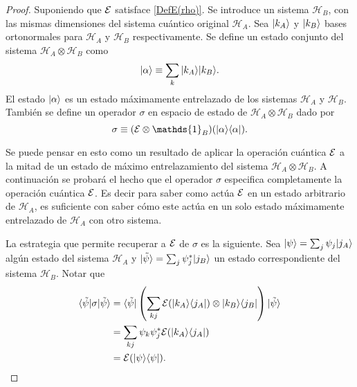 \begin{proof}
Suponiendo que $\mathcal{E}$ satisface {\ref{DefE(rho)}}. Se introduce un sistema
$\mathcal{H}_B$, con las mismas dimensiones del sistema cuántico original
$\mathcal{H}_A$. Sea $|k_A\rangle$ y $|k_B\rangle$  bases ortonormales para $\mathcal{H}_A$ y $\mathcal{H}_B$
respectivamente. Se define un estado conjunto del sistema $\mathcal{H}_A\otimes
\mathcal{H}_B$ como \[|\alpha\rangle \equiv \sum_k |k_A\rangle |k_B\rangle.\] El estado
$|\alpha\rangle $ es un estado máximamente entrelazado de los sistemas
$\mathcal{H}_A$ y $\mathcal{H}_B$. También se define un operador $\sigma$ en
espacio de estado de $\mathcal{H}_A\otimes \mathcal{H}_B$ dado por 
\begin{equation}\label{sigma1}
    \sigma \equiv (\E\otimes\mathds{1}_B)(|\alpha\rala \alpha|).
\end{equation}


Se puede pensar en esto como un resultado de aplicar la operación cuántica $\mathcal{E}$
a la mitad de un estado de máximo entrelazamiento del sistema
$\mathcal{H}_A\otimes \mathcal{H}_B$. A continuación se probará el hecho que el operador $\sigma$ especifica completamente la operación cuántica $\mathcal{E}$. Es decir para saber como actúa $\mathcal{E}$ en un estado arbitrario de $\mathcal{H}_A$, es suficiente con saber cómo este actúa en un solo estado máximamente entrelazado de $\mathcal{H}_A$ con otro sistema. 


La estrategia que permite recuperar a $\mathcal{E}$ de $\sigma$ es la siguiente. Sea $|\psi\rangle=\sum_j \psi_j |j_A\rangle$ algún estado del sistema $\mathcal{H}_A$ y $|\tilde{\psi}\rangle = \sum_j \psi_j^*|j_B\rangle$ un estado correspondiente del sistema $\mathcal{H}_B$. Notar que
\begin{equation}
    \begin{split}
        \langle \tilde \psi |\sigma |\tilde{\psi}\rangle&= \langle \tilde \psi |\left(\sum_{kj} \mathcal{E} (|k_A \rangle \langle j_A|)\otimes |k_B\rangle \langle j_B|\right) |\tilde{\psi}\rangle\\
        &=\sum_{kj} \psi_k \psi_j^* \mathcal{E} (|k_A \rangle \langle j_A|)\\
        &=\mathcal{E}(|\psi\rangle \langle\psi|).
    \end{split}
\end{equation}


\end{proof}
